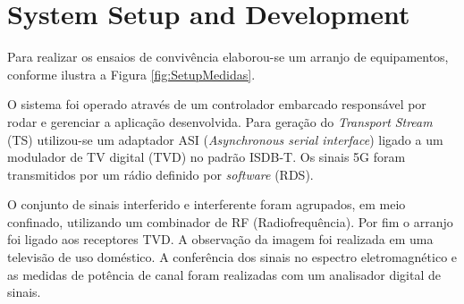 \section {System Setup and Development}
Para realizar os ensaios de convivência elaborou-se um arranjo de equipamentos, conforme ilustra a Figura
\ref{fig:SetupMedidas}. \par
O sistema foi operado através de um controlador embarcado responsável por rodar e gerenciar a aplicação desenvolvida. Para geração do \textit{Transport} \textit{Stream} (TS) utilizou-se um adaptador ASI (\textit{Asynchronous serial interface}) ligado a um modulador de TV digital (TVD) no padrão ISDB-T. Os sinais 5G foram transmitidos por um rádio definido por \textit{software} (RDS).\par



O conjunto de sinais interferido e interferente foram agrupados, em meio confinado, utilizando um combinador de RF (Radiofrequência). Por fim o arranjo foi ligado aos receptores TVD. A observação da imagem foi realizada em uma televisão de uso doméstico. A conferência dos sinais no espectro eletromagnético e as medidas de potência de canal foram realizadas com um analisador digital de sinais. \par



